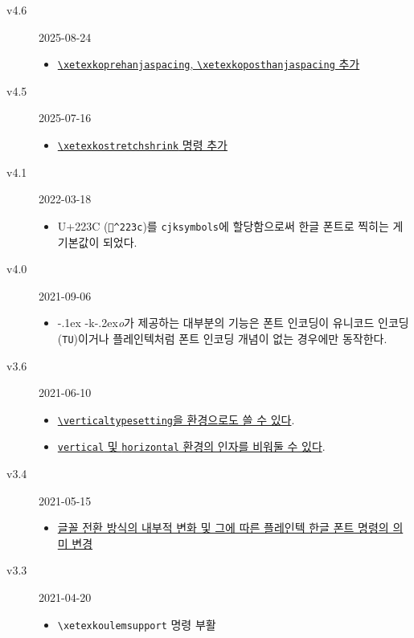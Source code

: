 \documentclass[a4paper]{article}
\def\logoko{\textsf{k}\kern-.2ex\textit{o}}
\def\XeTeX{\hologo{XeTeX}}
\def\xetexko{\XeTeX\kern-.1ex -\logoko}
\def\cs#1{\texttt{\textbackslash #1}}
\def\hparen#1{{\small\hangulparens(#1)}}
\begin{document}
\begin{small}\linespread{1.2}\selectfont
\begin{description}
    \item[v4.6] 2025-08-24
      \begin{itemize}
        \item \hyperref[sec:etccmds]{\cs{xetexkoprehanjaspacing}, \cs{xetexkoposthanjaspacing} 추가}
      \end{itemize}
    \item[v4.5] 2025-07-16
      \begin{itemize}
        \item \hyperref[sec:etccmds]{\cs{xetexkostretchshrink} 명령 추가}
      \end{itemize}
    \item[v4.1] 2022-03-18
      \begin{itemize}
        \item U+223C \hparen{\texttt{^^^^223c}}를
          \verb|cjksymbols|에 할당함으로써
          한글 폰트로 찍히는 게 기본값이 되었다.
      \end{itemize}
    \item[v4.0] 2021-09-06
      \begin{itemize}
        \item \xetexko 가 제공하는 대부분의 기능은 폰트 인코딩이
          유니코드 인코딩(\texttt{TU})이거나 플레인텍처럼 폰트 인코딩 개념이 없는
          경우에만 동작한다.
      \end{itemize}
    \item[v3.6] 2021-06-10
      \begin{itemize}
        \item \hyperref[sec:verttype]
          {\cs{verticaltypesetting}을 환경으로도 쓸 수 있다}.
        \item \hyperref[sec:verttype]
          {\texttt{vertical} 및 \texttt{horizontal} 환경의 인자를 비워둘 수 있다}.
      \end{itemize}
    \item[v3.4] 2021-05-15
      \begin{itemize}
        \item \hyperref[sec:fontcmds]
          {글꼴 전환 방식의 내부적 변화 및 그에 따른 플레인텍 한글 폰트 명령의 의미 변경}
      \end{itemize}
    \item[v3.3] 2021-04-20
      \begin{itemize}
        \item \cs{xetexkoulemsupport} 명령 부활

\end{itemize}
\end{description}
\end{small}
\end{document}
